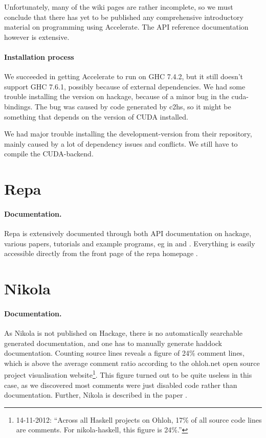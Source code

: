Unfortunately, many of the wiki pages are rather incomplete, so we must
conclude that there has yet to be published any comprehensive introductory
material on programming using Accelerate.
The API reference documentation however is extensive.

\paragraph{Installation process} We succeeded in getting Accelerate to run on
GHC 7.4.2, but it still doesn't support GHC 7.6.1, possibly because of external
dependencies.  We had some trouble installing the version on hackage, because
of a minor bug in the cuda-bindings. The bug was caused by code generated by
c2hs, so it might be something that depends on the version of CUDA installed.

We had major trouble installing the development-version from their repository,
mainly caused by a lot of dependency issues and conflicts. We still have to
compile the CUDA-backend.  

\section{Repa}

\paragraph{Documentation.} Repa is extensively documented through both API
documentation on hackage, various papers, tutorials and example programs, eg in
\cite{lippmeier2012guiding} and \cite{keller2010regular}.  Everything is easily
accessible directly from the front page of the repa homepage
\cite{homepage:repa}.

\section{Nikola}

\paragraph{Documentation.} As Nikola is not published on Hackage, there is no
automatically searchable generated documentation, and one has to manually
generate haddock documentation. Counting source lines reveals a figure of 24\%
comment lines, which is above the average comment ratio according to the
ohloh.net open source project visualisation website\footnote{14-11-2012:
``Across all Haskell projects on Ohloh, 17\% of all source code lines are
comments. For nikola-haskell, this figure is 24\%.''}. This figure turned out
to be quite useless in this case, as we discovered most comments were just
disabled code rather than documentation. Further, Nikola is described in the
paper \cite{mainland2010nikola}.

